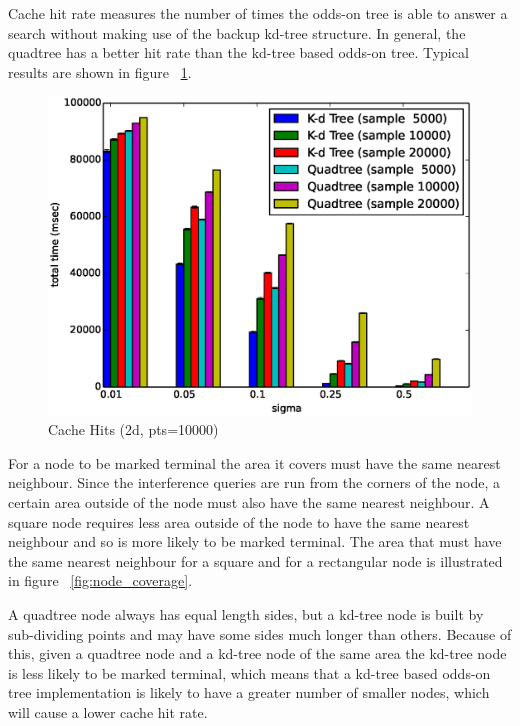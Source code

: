 \documentclass[mcs]{scsthesis}
\begin{document}
Cache hit rate measures the number of times the odds-on tree is able to answer
a search without making use of the backup kd-tree structure. In general, the
quadtree has a better hit rate than the kd-tree based odds-on tree. Typical
results are shown in figure ~\ref{fig:2d_kd_qt_hits}.

\begin{figure}
\begin{center}
\includegraphics[scale=0.5]{diagrams/2d_qt_kt_pts10000_hits.eps}
\caption{Cache Hits (2d, pts=10000)}
\label{fig:2d_kd_qt_hits}
\end{center}
\end{figure}

For a node to be marked terminal the area it covers must have the same nearest
neighbour. Since the interference queries are run from the corners of the node,
a certain area outside of the node must also have the same nearest neighbour.
A square node requires less area outside of the node to have the same nearest
neighbour and so is more likely to be marked terminal. The area that must have
the same nearest neighbour for a square and for a rectangular node is
illustrated in figure ~\ref{fig:node_coverage}.

A quadtree node always has equal length sides, but a kd-tree node is built
by sub-dividing points and may have some sides much longer than others. Because
of this, given a quadtree node and a kd-tree node of the same area the kd-tree
node is less likely to be marked terminal, which means that a kd-tree based
odds-on tree implementation is likely to have a greater number of smaller nodes,
which will cause a lower cache hit rate.
\end{document}
